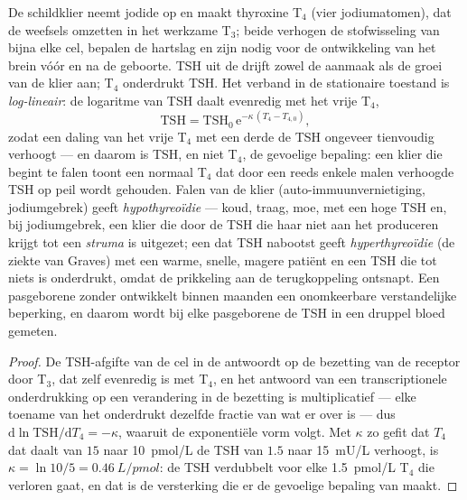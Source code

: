\begin{proposition}\label{prop:b3:endocrinology:thyroid}
De schildklier neemt jodide op en maakt thyroxine T$_{4}$ (vier
jodiumatomen), dat de weefsels omzetten in het werkzame T$_{3}$; beide
verhogen de stofwisseling van bijna elke cel, bepalen de hartslag en
zijn nodig voor de ontwikkeling van het brein vóór en na de geboorte.
TSH uit de  drijft zowel de aanmaak als de groei van de klier
aan; T$_{4}$ onderdrukt TSH. Het verband in de stationaire toestand is
\emph{log-lineair}: de logaritme van TSH daalt evenredig met het vrije
T$_{4}$,
\[
\text{TSH} = \text{TSH}_{0}\,\mathrm{e}^{-\kappa\,(T_{4} - T_{4,0})},
\]
zodat een daling van het vrije T$_{4}$ met een derde de TSH ongeveer
tienvoudig verhoogt --- en daarom is TSH, en niet T$_{4}$, de gevoelige
bepaling: een klier die begint te falen toont een normaal T$_{4}$ dat
door een reeds enkele malen verhoogde TSH op peil wordt gehouden. Falen
van de klier (auto-immuunvernietiging, jodiumgebrek) geeft
\emph{hypothyreoïdie} --- koud, traag, moe, met een hoge TSH en, bij
jodiumgebrek, een klier die door de TSH die haar niet aan het
produceren krijgt tot een \emph{struma} is uitgezet; een 
dat TSH nabootst geeft \emph{hyperthyreoïdie} (de ziekte van Graves)
met een warme, snelle, magere patiënt en een TSH die tot niets is
onderdrukt, omdat de prikkeling aan de terugkoppeling ontsnapt. Een
pasgeborene zonder  ontwikkelt binnen maanden een
onomkeerbare verstandelijke beperking, en daarom wordt bij elke
pasgeborene de TSH in een druppel bloed gemeten.
\end{proposition}
\begin{proof}
De TSH-afgifte van de cel in de  antwoordt op de bezetting van
de receptor door T$_{3}$, dat zelf evenredig is met T$_{4}$, en het
antwoord van een transcriptionele onderdrukking op een verandering in
de bezetting is multiplicatief --- elke toename van het 
onderdrukt dezelfde fractie van wat er over is --- dus
$\mathrm{d}\ln\text{TSH}/\mathrm{d}T_{4} = -\kappa$, waaruit de
exponentiële vorm volgt. Met $\kappa$ zo gefit dat $T_{4}$ dat daalt
van $15$ naar \qty{10}{pmol/L} de TSH van $1.5$ naar \qty{15}{mU/L}
verhoogt, is $\kappa = \ln 10/5 = \qty{0.46}{L/pmol}$: de TSH verdubbelt
voor elke \qty{1.5}{pmol/L} T$_{4}$ die verloren gaat, en dat is de
versterking die er de gevoelige bepaling van maakt.
\end{proof}

